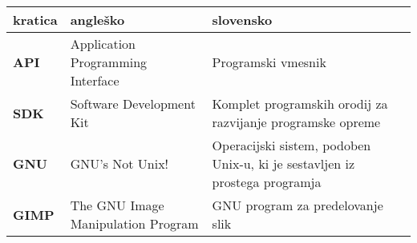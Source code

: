 \begin{tabular}{l|p{5cm}|p{6cm}}
  {\bf kratica} & {\bf angleško} & {\bf slovensko} \\ \hline
  {\bf API} & Application Programming Interface & Programski vmesnik \\
  {\bf SDK} & Software Development Kit & Komplet programskih orodij za razvijanje programske opreme \\
  {\bf GNU} & GNU's Not Unix! & Operacijski sistem, podoben Unix-u, ki je sestavljen iz prostega programja \\
  {\bf GIMP} & The GNU Image Manipulation Program & GNU program za predelovanje slik \\
\end{tabular}

